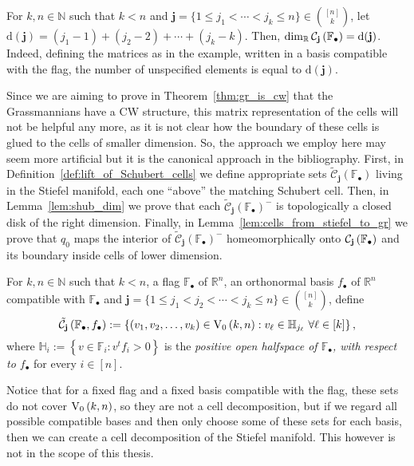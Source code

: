 \begin{remark} For $k,n\in\mathbb{N}$ such that $k<n$ and $\mathbf{j}=\{1\leq j_1<\cdots<j_k\leq n\}\in\binom{[n]}{k}$, let $\mathrm{d}(\mathbf{j})=(j_1-1)+(j_2-2)+\cdots+(j_k-k)$. Then, $\dim_{\mathbb{R}}\mathcal{C}_{\mathbf{j}}\left(\mathbb{F}_{\bullet}\right)=\mathrm{d}(\mathbf{j})$. Indeed, defining the matrices as in the example, written in a basis compatible with the flag, the number of unspecified elements is equal to $\mathrm{d}(\mathbf{j})$.
\end{remark}

Since we are aiming to prove in Theorem~\ref{thm:gr_is_cw} that the Grassmannians have a CW structure, this matrix representation of the cells will not be helpful any more, as it is not clear how the boundary of these cells is glued to the cells of smaller dimension. So, the approach we employ here may seem more artificial but it is the canonical approach in the bibliography. First, in Definition~\ref{def:lift_of_Schubert_cells} we define appropriate sets $\tilde{\mathcal{C}}_{\mathbf{j}}(\mathbb{F}_{\bullet})$ living in the Stiefel manifold, each one ``above'' the matching Schubert cell. Then, in Lemma~\ref{lem:shub_dim} we prove that each $\tilde{\mathcal{C}}_{\mathbf{j}}{\left(\mathbb{F}_{\bullet}\right)}^-$ is topologically a closed disk of the right dimension. Finally, in Lemma~\ref{lem:cells_from_stiefel_to_gr} we prove that $q_0$ maps the interior of $\tilde{\mathcal{C}}_{\mathbf{j}}(\mathbb{F}_{\bullet})^-$ homeomorphically onto $\mathcal{C}_{\mathbf{j}}\left(\mathbb{F}_{\bullet}\right)$ and its boundary inside cells of lower dimension.

\begin{definition}\label{def:lift_of_Schubert_cells} For $k,n\in\mathbb{N}$ such that $k<n$, a flag $\mathbb{F}_{\bullet}$ of $\mathbb{R}^n$, an orthonormal basis $f_{\bullet}$ of $\mathbb{R}^n$ compatible with $\mathbb{F}_{\bullet}$ and $\mathbf{j}=\{1\leq j_1<j_2<\cdots<j_k\leq n\}\in\binom{[n]}{k}$, define
\[\stcell{j}:=\left\{(v_1,v_2,\ldots,v_k)\in\StO{k}{n}:v_{\ell}\in\mathbb{H}_{j_{\ell}}\ \forall\ell\in[k]\right\},\]
where $\mathbb{H}_i:=\left\{v\in\mathbb{F}_i:v^tf_i>0\right\}$ is the \emph{positive open halfspace of $\mathbb{F}_{\bullet}$, with respect to $f_{\bullet}$} for every $i\in[n]$.
\end{definition}

Notice that for a fixed flag and a fixed basis compatible with the flag, these sets do not cover $\StO{k}{n}$, so they are not a cell decomposition, but if we regard all possible compatible bases and then only choose some of these sets for each basis, then we can create a cell decomposition of the Stiefel manifold. This however is not in the scope of this thesis.

